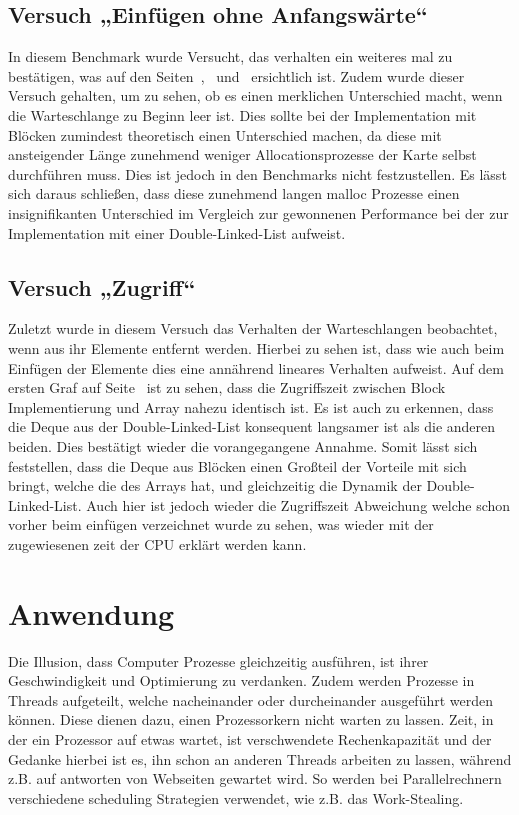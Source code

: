 \documentclass{TUBAFarbeiten}
\begin{document}
\subsection{Versuch „Einfügen ohne Anfangswärte“}
In diesem Benchmark wurde Versucht, das verhalten ein weiteres mal zu bestätigen, was auf den Seiten~\pageref{fig:Array0-60},~\pageref{fig:Linked0-60} und~\pageref{fig:Block0-60} ersichtlich ist. Zudem wurde dieser Versuch gehalten, um zu sehen, ob es einen merklichen Unterschied macht, wenn die Warteschlange zu Beginn leer ist. Dies sollte bei der Implementation mit Blöcken zumindest theoretisch einen Unterschied machen, da diese mit ansteigender Länge zunehmend weniger Allocationsprozesse der Karte selbst durchführen muss. Dies ist jedoch in den Benchmarks nicht festzustellen. Es lässt sich daraus schließen, dass diese zunehmend langen malloc Prozesse einen insignifikanten Unterschied im Vergleich zur gewonnenen Performance bei der zur Implementation mit einer Double-Linked-List aufweist.  
\subsection{Versuch „Zugriff“}
Zuletzt wurde in diesem Versuch das Verhalten der Warteschlangen beobachtet, wenn aus ihr Elemente entfernt werden. Hierbei zu sehen ist, dass wie auch beim Einfügen der Elemente dies eine annährend lineares Verhalten aufweist. Auf dem ersten Graf auf Seite~\pageref{fig:Zugriff} ist zu sehen, dass die Zugriffszeit zwischen Block Implementierung und Array nahezu identisch ist. Es ist auch zu erkennen, dass die Deque aus der Double-Linked-List konsequent langsamer ist als die anderen beiden. Dies bestätigt wieder die vorangegangene Annahme. Somit lässt sich feststellen, dass die Deque aus Blöcken einen Großteil der Vorteile mit sich bringt, welche die des Arrays hat, und gleichzeitig die Dynamik der Double-Linked-List. Auch hier ist jedoch wieder die Zugriffszeit Abweichung welche schon vorher beim einfügen verzeichnet wurde zu sehen, was wieder mit der zugewiesenen zeit der CPU erklärt werden kann.
\section{Anwendung}
Die Illusion, dass Computer Prozesse gleichzeitig ausführen, ist ihrer Geschwindigkeit und Optimierung zu verdanken. Zudem werden Prozesse in Threads aufgeteilt, welche nacheinander oder durcheinander ausgeführt werden können. Diese dienen dazu, einen Prozessorkern nicht warten zu lassen. Zeit, in der ein Prozessor auf etwas wartet, ist verschwendete Rechenkapazität und der Gedanke hierbei ist es, ihn schon an anderen Threads arbeiten zu lassen, während z.B. auf antworten von Webseiten gewartet wird. So werden bei Parallelrechnern verschiedene scheduling Strategien verwendet, wie z.B. das Work-Stealing.
\end{document}
